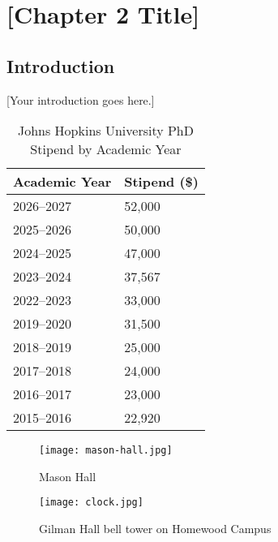 \chapter{[Chapter 2 Title]}
\label{ch:chapter2}

\section{Introduction}

[Your introduction goes here.]


\begin{table}[ht]
\centering
\caption{Johns Hopkins University PhD Stipend by Academic Year}
\label{tab:jhu_stipends}
\begin{tabular}{ll}
\toprule
\textbf{Academic Year} & \textbf{Stipend (\$)} \\
\midrule
2026--2027 & 52,000 \\
2025--2026 & 50,000 \\
2024--2025 & 47,000 \\
2023--2024 & 37,567 \\
2022--2023 & 33,000 \\
2019--2020 & 31,500 \\
2018--2019 & 25,000 \\
2017--2018 & 24,000 \\
2016--2017 & 23,000 \\
2015--2016 & 22,920 \\
\bottomrule
\end{tabular}
\end{table}


\begin{figure}[ht]
    \centering
    \texttt{[image: mason-hall.jpg]}
    \caption{Mason Hall}
    \label{fig:mason-hall}
\end{figure}

\begin{figure}[ht]
    \centering
    \texttt{[image: clock.jpg]}
    \caption{Gilman Hall bell tower on Homewood Campus}
    \label{fig:clock}
\end{figure}